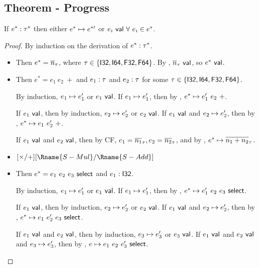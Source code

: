 \documentclass[acmsmall, review]{acmart}
\theoremstyle{definition}
\begin{document}
\subsection{Theorem - Progress}
If $e^* : \tau^*$ then either $e^*\mapsto e^{*\prime}$ or $e_i ~\mathsf{val}~ \forall~ e_i \in e^*$.
\begin{proof}
    By induction on the derivation of $e^* : \tau^*$.
    \begin{itemize}
        \item {}
            Then $e^* = \overline{n}_\tau$, where $\tau \in \{\mathsf{I32}, \mathsf{I64}, \mathsf{F32}, \mathsf{F64}\}$.
            By , $\overline{n}_\tau ~\mathsf{val}$, so $e^* ~\mathsf{val}$.
        
        \item {}
            Then $e^* = e_1~ e_2~ +$ and $e_1 : \tau$ and $e_2 : \tau$ for some $\tau \in \{\mathsf{I32}, \mathsf{I64}, \mathsf{F32}, \mathsf{F64}\}$.
            
            By induction, $e_1 \mapsto e_1'$ or $e_1 ~\mathsf{val}$.
            If $e_1 \mapsto e_1'$, then by , $e^* \mapsto e_1'~ e_2~ +$.
            
            If $e_1 ~\mathsf{val}$, then by induction, $e_2 \mapsto e_2'$ or $e_2 ~\mathsf{val}$.
            If $e_1 ~\mathsf{val}$ and $e_2 \mapsto e_2'$, then by , $e^* \mapsto e_1~ e_2'~ +$.
            
            If $e_1 ~\mathsf{val}$ and $e_2 ~\mathsf{val}$, then by CF, $e_1 = \overline{n_1}_\tau, e_2 = \overline{n_2}_\tau$, and by , $e^* \mapsto \overline{n_1 + n_2}_\tau$.
        
        \item {}
            $[\times / +][\Rname{S-Mul} / \Rname{S-Add}]$ 
        
        \item {}
            Then $e^* = e_1 ~ e_2 ~ e_3 ~ \mathsf{select}$ and $e_1 : \mathsf{I32}$. %
            
            By induction, $e_1 \mapsto e_1'$ or $e_1 ~\mathsf{val}$.
            If $e_1 \mapsto e_1'$, then by , $e^* \mapsto e_1' ~ e_2 ~ e_3 ~ \mathsf{select}$.
            
            If $e_1 ~\mathsf{val}$, then by induction, $e_2 \mapsto e_2'$ or $e_2 ~\mathsf{val}$.
            If $e_1 ~\mathsf{val}$ and $e_2 \mapsto e_2'$, then by , $e^* \mapsto e_1 ~ e_2' ~ e_3 ~ \mathsf{select}$.
            
            If $e_1 ~\mathsf{val}$ and $e_2 ~\mathsf{val}$, then by induction, $e_3 \mapsto e_3'$ or $e_3 ~\mathsf{val}$.
            If $e_1 ~\mathsf{val}$ and $e_2 ~\mathsf{val}$ and $e_3 \mapsto e_3'$, then by , $e \mapsto e_1 ~ e_2 ~ e_3' ~ \mathsf{select}$.
            

\end{itemize}
\end{proof}
\end{document}
